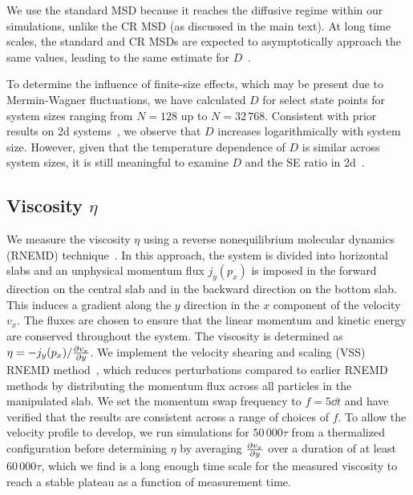 \documentclass[amsmath,amssymb,prl,reprint,twocolumn]{revtex4-2}
\begin{document}
We use the standard MSD because it reaches the diffusive regime within our simulations, unlike the CR MSD (as discussed in the main text).
At long time scales, the standard and CR MSDs are expected to asymptotically approach the same values, leading to the same estimate for $D$~\cite{Flenner2019,Shiba2019}.

To determine the influence of finite-size effects, which may be present due to Mermin-Wagner fluctuations, we have calculated $D$ for select state points for system sizes ranging from $N=128$ up to $N=32\,768$. 
Consistent with prior results on 2d systems~\cite{Choi2017,Shiba2019}, we observe that $D$ increases logarithmically with system size.
However, given that the temperature dependence of $D$ is similar across system sizes, it is still meaningful to examine $D$ and the SE ratio in 2d~\cite{Shiba2019}.




\subsection{Viscosity $\eta$}
We measure the viscosity $\eta$ using a reverse nonequilibrium molecular dynamics (RNEMD) technique~\cite{MullerPlathe1997,MullerPlathe1999, Kuang2010,Kuang2012}.
In this approach, the system is divided into horizontal slabs and an unphysical momentum flux $j_y(p_x)$ is imposed in the forward direction on the central slab and in the backward direction on the bottom slab.
This induces a gradient along the $y$ direction in the $x$ component of the velocity $v_x$.
The fluxes are chosen to ensure that the linear momentum and kinetic energy are conserved throughout the system.
The viscosity is determined as $\eta=-j_y(p_x)/\pdv{v_x}{y}$.
We implement the velocity shearing and scaling (VSS) RNEMD method~\cite{Kuang2012}, 
which reduces perturbations compared to earlier RNEMD methods by distributing the momentum flux across all particles in the manipulated slab.
We set the momentum swap frequency to $f=5\dd t$ and have verified that the results are consistent across a range of choices of $f$.
To allow the velocity profile to develop, we run simulations for $50\,000\tau$ from a thermalized configuration before determining $\eta$ by averaging $\pdv{v_x}{y}$ over a duration of at least $60\,000\tau$, which we find is a long enough time scale for the measured viscosity to reach a stable plateau as a function of measurement time.
\end{document}
